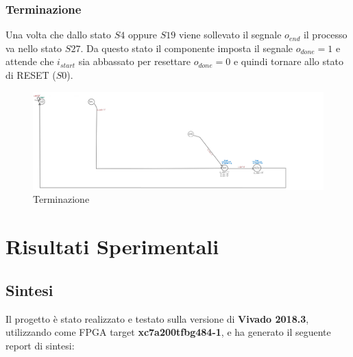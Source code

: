 \documentclass[12pt]{article} %
\begin{document}
			\subsubsection{Terminazione}
				Una volta che dallo stato $S4$ oppure $S19$ viene sollevato il segnale $o_{end}$
				il processo va nello stato $S27$. Da questo stato
				il componente imposta il segnale $o_{done} = 1$ e attende che $i_{start}$ sia abbassato 
				per resettare $o_{done} = 0$ e quindi tornare allo stato di RESET ($S0$). 
				\begin{figure}[h]
					\centering
					\includegraphics[width=\textwidth]{FSM_terminazione.jpg}
					\caption{Terminazione}
					\label{fig:FSM_terminazione}
				\end{figure}
				\newpage
	\section{Risultati Sperimentali}
		\subsection{Sintesi}
			Il progetto è stato realizzato e testato sulla versione di \textbf{Vivado 2018.3}, utilizzando come
			FPGA target \textbf{xc7a200tfbg484-1}, e ha generato il seguente report di sintesi:\\
			
\end{document}

